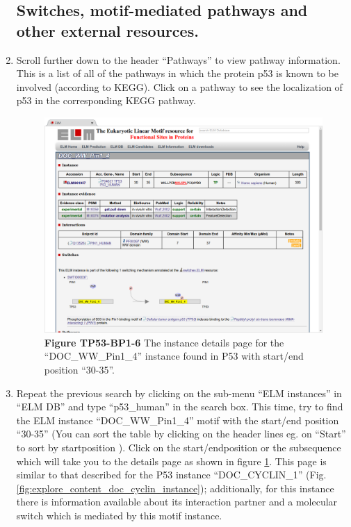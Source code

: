 \begin{enumerate}
%
%
\subsection{Switches, motif-mediated pathways and other external resources.}
\label{subsec:explore_content_external_resoureces}

\item Scroll further down to the header ``Pathways'' to view pathway
	information. This is a list of all of the pathways in which the protein
	p53 is known to be involved (according to KEGG). Click on a pathway to
	see the localization of p53 in the corresponding KEGG pathway.

\begin{figure}[h!]
	\centering
	\includegraphics[width=\textwidth]{Figures/explore_content/doc_ww_pin_1_4_instance.png}
	\caption{
	\textbf{Figure TP53-BP1-6}
	The instance details page for the
	``DOC\_WW\_Pin1\_4'' instance found in P53 with start/end position
	``30-35''.
	}
	\label{fig:explore_content_doc_ww_instance}
\end{figure}

\item Repeat the previous search by clicking on the sub-menu ``ELM instances''
	in ``ELM DB'' and type ``p53\_human'' in the search box.  This time,
	try to find the ELM instance ``DOC\_WW\_Pin1\_4'' motif with the
	start/end position ``30-35'' (You can sort the table by clicking on the
	header lines eg. on ``Start'' to sort by startposition ). Click on the
	start/endposition or the subsequence which will take you to the details
	page as shown in figure \ref{fig:explore_content_doc_ww_instance}. This
	page is similar to that described for the P53 instance ``DOC\_CYCLIN\_1''
	(Fig. \ref{fig:explore_content_doc_cyclin_instance});
	additionally, for this instance there is information available about
	its interaction partner and a molecular switch which is mediated by
	this motif instance.


\end{enumerate}
